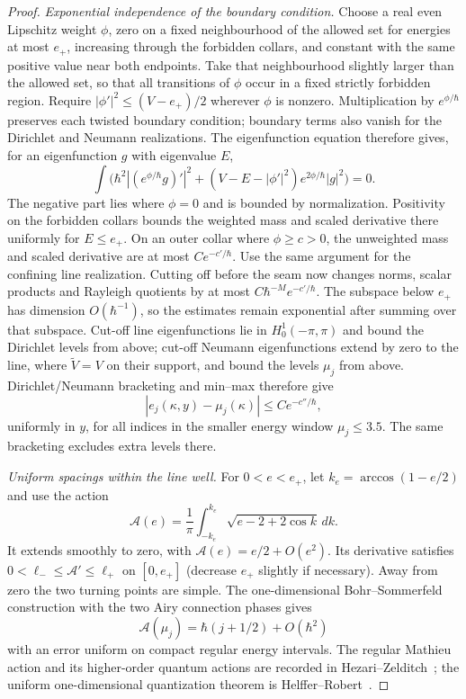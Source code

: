 \begin{proof}
\emph{Exponential independence of the boundary condition.} Choose a real even Lipschitz weight $\phi$, zero on a fixed neighbourhood of the allowed set for energies at most $e_+$, increasing through the forbidden collars, and constant with the same positive value near both endpoints. Take that neighbourhood slightly larger than the allowed set, so that all transitions of $\phi$ occur in a fixed strictly forbidden region. Require $|\phi'|^2\le(V-e_+)/2$ wherever $\phi$ is nonzero. Multiplication by $e^{\phi/\hbar}$ preserves each twisted boundary condition; boundary terms also vanish for the Dirichlet and Neumann realizations. The eigenfunction equation therefore gives, for an eigenfunction $g$ with eigenvalue $E$,
\[
 \int\bigl(\hbar^2|(e^{\phi/\hbar}g)'|^2
 +(V-E-|\phi'|^2)e^{2\phi/\hbar}|g|^2\bigr)=0.
\]
The negative part lies where $\phi=0$ and is bounded by normalization. Positivity on the forbidden collars bounds the weighted mass and scaled derivative there uniformly for $E\le e_+$. On an outer collar where $\phi\ge c>0$, the unweighted mass and scaled derivative are at most $Ce^{-c'/\hbar}$. Use the same argument for the confining line realization. Cutting off before the seam now changes norms, scalar products and Rayleigh quotients by at most $C\hbar^{-M}e^{-c'/\hbar}$. The subspace below $e_+$ has dimension $O(\hbar^{-1})$, so the estimates remain exponential after summing over that subspace. Cut-off line eigenfunctions lie in $H_0^1(-\pi,\pi)$ and bound the Dirichlet levels from above; cut-off Neumann eigenfunctions extend by zero to the line, where $\widetilde V=V$ on their support, and bound the levels $\mu_j$ from above. Dirichlet/Neumann bracketing and min--max therefore give
\begin{equation}\label{eq:twisttunnel}
 |e_j(\kappa,y)-\mu_j(\kappa)|\le Ce^{-c''/\hbar},
\end{equation}
uniformly in $y$, for all indices in the smaller energy window $\mu_j\le3.5$. The same bracketing excludes extra levels there.

\emph{Uniform spacings within the line well.} For $0<e<e_+$, let $k_e=\arccos(1-e/2)$ and use the action
\begin{equation}\label{eq:action}
 \mathcal A(e)=\frac1\pi\int_{-k_e}^{k_e}
                    \sqrt{e-2+2\cos k}\,dk.
\end{equation}
It extends smoothly to zero, with $\mathcal A(e)=e/2+O(e^2)$. Its derivative satisfies $0<\ell_-\le\mathcal A'\le\ell_+$ on $[0,e_+]$ (decrease $e_+$ slightly if necessary). Away from zero the two turning points are simple. The one-dimensional Bohr--Sommerfeld construction with the two Airy connection phases gives
\begin{equation}\label{eq:BS}
 \mathcal A(\mu_j)=\hbar(j+1/2)+O(\hbar^2)
\end{equation}
with an error uniform on compact regular energy intervals. The regular Mathieu action and its higher-order quantum actions are recorded in Hezari--Zelditch~\cite[Section~3.4]{HezariZelditch}; the uniform one-dimensional quantization theorem is Helffer--Robert~\cite[Theorem~3.14 and Corollary~3.15]{HelfferRobert}.


\end{proof}
